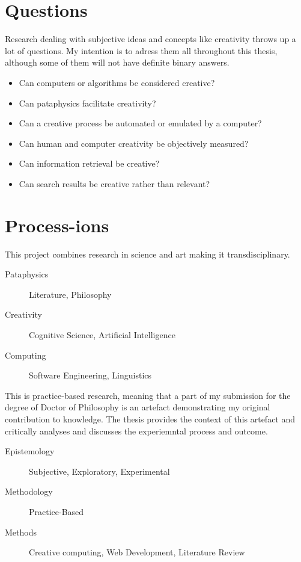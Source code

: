 \section{Questions}

Research dealing with subjective ideas and concepts like creativity throws up a lot of questions. My intention is to adress them all throughout this thesis, although some of them will not have definite binary answers.


\begin{itemize}
  \item Can computers or algorithms be considered creative?
  \item Can pataphysics facilitate creativity?
  \item Can a creative process be automated or emulated by a computer?
  \item Can human and computer creativity be objectively measured?
  \item Can information retrieval be creative?
  \item Can search results be creative rather than relevant?
\end{itemize}


\section{Process-ions}

This project combines research in science and art making it transdisciplinary.

\begin{description}
  \item [Pataphysics] Literature, Philosophy
  \item [Creativity] Cognitive Science, Artificial Intelligence
  \item [Computing] Software Engineering, Linguistics
\end{description}

This is practice-based research, meaning that a part of my submission for the degree of Doctor of Philosophy is an artefact demonstrating my original contribution to knowledge. The thesis provides the context of this artefact and critically analyses and discusses the experiemntal process and outcome.

\begin{description}
  \item [Epistemology] Subjective, Exploratory, Experimental
  \item [Methodology] Practice-Based
  \item [Methods] Creative computing, Web Development, Literature Review
\end{description}

